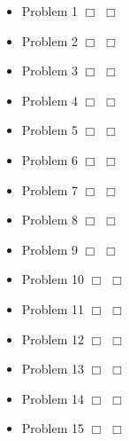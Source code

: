 \documentclass[12pt]{article}
\begin{document}
\begin{minipage}[t]{\textwidth}
\begin{mdframed}
\begin{multicols}{3}
\begin{itemize}
	\setlength\itemsep{0em}	
	\item{Problem 1 $\Box$ \hspace{0.2cm} $\Box$}
	\item{Problem 2 $\Box$ \hspace{0.2cm} $\Box$}
	\item{Problem 3 $\Box$ \hspace{0.2cm} $\Box$}
	\item{Problem 4 $\Box$ \hspace{0.2cm} $\Box$}
	\item{Problem 5 $\Box$ \hspace{0.2cm} $\Box$}
\end{itemize}
\columnbreak
\begin{itemize}
	\setlength\itemsep{0em}	
	\item{Problem 6 $\Box$ \hspace{0.2cm} $\Box$}
	\item{Problem 7 $\Box$ \hspace{0.2cm} $\Box$}
	\item{Problem 8 $\Box$ \hspace{0.2cm} $\Box$}
	\item{Problem 9 $\Box$ \hspace{0.2cm} $\Box$}
	\item{Problem 10 $\Box$ \hspace{0.2cm} $\Box$}
\end{itemize}
\columnbreak
\begin{itemize}
	\setlength\itemsep{0em}	
	\item{Problem 11 $\Box$ \hspace{0.2cm} $\Box$}
	\item{Problem 12 $\Box$ \hspace{0.2cm} $\Box$}
	\item{Problem 13 $\Box$ \hspace{0.2cm} $\Box$}
	\item{Problem 14 $\Box$ \hspace{0.2cm} $\Box$}
	\item{Problem 15 $\Box$ \hspace{0.2cm} $\Box$}
\end{itemize}
\columnbreak
\end{multicols}

\end{mdframed}
\clearpage
\end{minipage}
\end{document}
